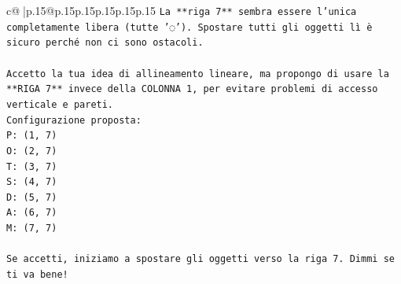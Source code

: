 \documentclass{article}
\begin{document}
{\begin{supertabular}{c@{$\;$}|p{.15\linewidth}@{}p{.15\linewidth}p{.15\linewidth}p{.15\linewidth}p{.15\linewidth}p{.15\linewidth}}
{{{\texttt{La **riga 7** sembra essere l'unica completamente libera (tutte '◌'). Spostare tutti gli oggetti lì è sicuro perché non ci sono ostacoli.} \\
\\ 
\texttt{Accetto la tua idea di allineamento lineare, ma propongo di usare la **RIGA 7** invece della COLONNA 1, per evitare problemi di accesso verticale e pareti.} \\
\texttt{Configurazione proposta:} \\
\texttt{P: (1, 7)} \\
\texttt{O: (2, 7)} \\
\texttt{T: (3, 7)} \\
\texttt{S: (4, 7)} \\
\texttt{D: (5, 7)} \\
\texttt{A: (6, 7)} \\
\texttt{M: (7, 7)} \\
\\ 
\texttt{Se accetti, iniziamo a spostare gli oggetti verso la riga 7. Dimmi se ti va bene!} \\
            }
        }
    }
     \\ \\


\end{supertabular}}
\end{document}
